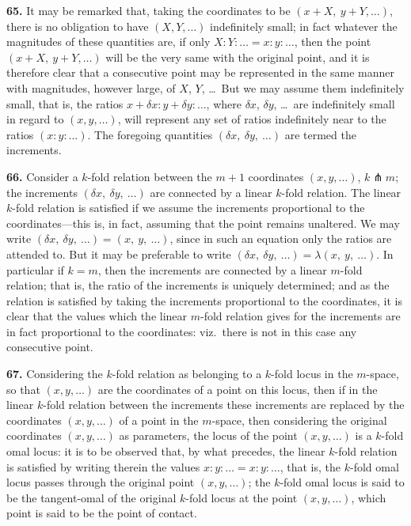 \documentclass[11pt,a4paper]{article}
\theoremstyle{definition}
\begin{document}
\noindent\textbf{65.} It may be remarked that, taking the coordinates to be $(x+X,\ y+Y,\ldots)$, there is no obligation to have $(X,Y,\ldots)$ indefinitely small; in fact whatever the magnitudes of these quantities are, if only $X:Y:\ldots=x:y:\ldots$, then the point $(x+X,\ y+Y,\ldots)$ will be the very same with the original point, and it is therefore clear that a consecutive point may be represented in the same manner with magnitudes, however large, of $X$, $Y$, \ldots\ But we may assume them indefinitely small, that is, the ratios $x+\delta x:y+\delta y:\ldots$, where $\delta x$, $\delta y$, \ldots\ are indefinitely small in regard to $(x,y,\ldots)$, will represent any set of ratios indefinitely near to the ratios $(x:y:\ldots)$. The foregoing quantities $(\delta x,\ \delta y,\ \ldots)$ are termed the increments.

\noindent\textbf{66.} Consider a $k$-fold relation between the $m+1$ coordinates $(x,y,\ldots)$, $k\pitchfork m$; the increments $(\delta x,\ \delta y,\ \ldots)$ are connected by a linear $k$-fold relation. The linear $k$-fold relation is satisfied if we assume the increments proportional to the coordinates---this is, in fact, assuming that the point remains unaltered. We may write $(\delta x,\ \delta y,\ \ldots)=(x,\ y,\ \ldots)$, since in such an equation only the ratios are attended to. But it may be preferable to write $(\delta x,\ \delta y,\ \ldots)=\lambda(x,\ y,\ \ldots)$. In particular if $k=m$, then the increments are connected by a linear $m$-fold relation; that is, the ratio of the increments is uniquely determined; and as the relation is satisfied by taking the increments proportional to the coordinates, it is clear that the values which the linear $m$-fold relation gives for the increments are in fact proportional to the coordinates: viz.\ there is not in this case any consecutive point.

\noindent\textbf{67.} Considering the $k$-fold relation as belonging to a $k$-fold locus in the $m$-space, so that $(x,y,\ldots)$ are the coordinates of a point on this locus, then if in the linear $k$-fold relation between the increments these increments are replaced by the coordinates $(x,y,\ldots)$ of a point in the $m$-space, then considering the original coordinates $(x,y,\ldots)$ as parameters, the locus of the point $(x,y,\ldots)$ is a $k$-fold omal locus: it is to be observed that, by what precedes, the linear $k$-fold relation is satisfied by writing therein the values $x:y:\ldots=x:y:\ldots$, that is, the $k$-fold omal locus passes through the original point $(x,y,\ldots)$; the $k$-fold omal locus is said to be the tangent-omal of the original $k$-fold locus at the point $(x,y,\ldots)$, which point is said to be the point of contact.
\end{document}
